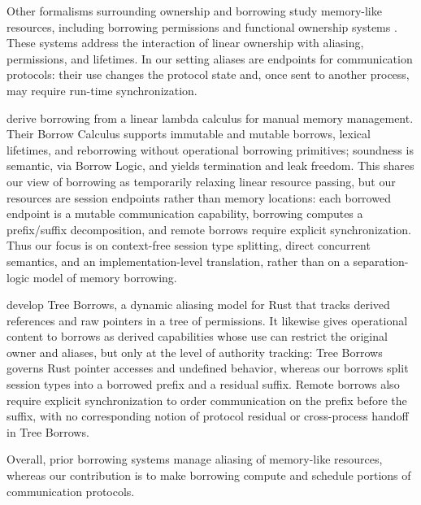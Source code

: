 Other formalisms surrounding ownership and borrowing study
memory-like resources, including borrowing permissions
\cite{DBLP:conf/popl/NadenBAB12} and functional ownership systems
\cite{DBLP:journals/corr/abs-2310-18166}.
These systems address the interaction of linear ownership with
aliasing, permissions, and lifetimes. In our setting
aliases are endpoints for communication protocols: their use changes
the protocol state and, once sent to another process, may require
run-time synchronization.

\citet{DBLP:journals/pacmpl/WagnerGML025} derive borrowing from a
linear lambda calculus for manual memory management. Their Borrow
Calculus supports immutable and mutable borrows, lexical lifetimes, and
reborrowing without operational borrowing primitives; soundness is
semantic, via Borrow Logic, and yields termination and leak freedom.
This shares our view of borrowing as temporarily relaxing linear
resource passing, but our resources are session endpoints rather than
memory locations: each borrowed endpoint is a mutable communication
capability, borrowing computes a prefix/suffix decomposition, and
remote borrows require explicit synchronization. Thus our focus is on
context-free session type splitting, direct concurrent semantics, and
an implementation-level translation, rather than on a separation-logic
model of memory borrowing.

\citet{DBLP:journals/pacmpl/VillaniHDJ25} develop Tree Borrows, a
dynamic aliasing model for Rust that tracks derived references and raw
pointers in a tree of permissions. It likewise gives operational
content to borrows as derived capabilities whose use can restrict the
original owner and aliases, but only at the level of authority
tracking: Tree Borrows governs Rust pointer accesses and undefined
behavior, whereas our borrows split session types into a borrowed
prefix and a residual suffix. Remote borrows also require explicit
synchronization to order communication on the prefix before the suffix,
with no corresponding notion of protocol residual or cross-process
handoff in Tree Borrows.

Overall, prior borrowing systems manage aliasing of memory-like
resources, whereas our contribution is to make borrowing compute and
schedule portions of communication protocols.


